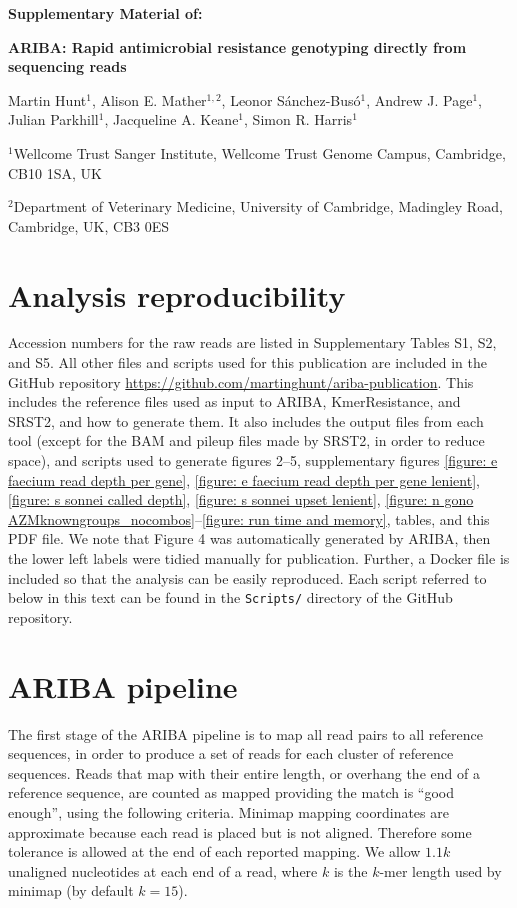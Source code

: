\documentclass[11pt, a4paper]{article}
\begin{document}
\makeatletter
\renewcommand{\thefigure}{S\@arabic\c@figure}
\renewcommand{\thetable}{S\@arabic\c@table}
\makeatother
\thispagestyle{empty}
{\noindent\bf Supplementary Material of: \vspace{2em}}

{\noindent\bf ARIBA: Rapid antimicrobial resistance genotyping directly from sequencing reads\vspace{2em}}


\noindent Martin Hunt$^{1}$,
Alison E. Mather$^{1,2}$,
Leonor S\'{a}nchez-Bus\'{o}$^{1}$,
Andrew J. Page$^{1}$,
Julian Parkhill$^{1}$,
Jacqueline A. Keane$^{1}$,
Simon R. Harris$^{1}$\vspace{2em}

\noindent$^{1}$Wellcome Trust Sanger Institute, Wellcome Trust Genome Campus, Cambridge, CB10 1SA, UK


\noindent$^{2}$Department of Veterinary Medicine, University of Cambridge, Madingley Road, Cambridge, UK, CB3 0ES


\newpage
\setcounter{tocdepth}{1}
\tableofcontents
\newpage


\section{Analysis reproducibility}
Accession numbers for the raw reads are listed in
Supplementary Tables S1, S2, and S5.
All other files and scripts used for this publication
are included in the GitHub repository
\url{https://github.com/martinghunt/ariba-publication}.
This includes the reference files used as input to ARIBA,
KmerResistance, and SRST2, and how to generate them. It also
includes the output files from each tool (except for the BAM
and pileup files made by SRST2, in order to reduce space), and scripts
used to generate figures 2--5, supplementary figures
\ref{figure: e faecium read depth per gene},
\ref{figure: e faecium read depth per gene lenient},
\ref{figure: s sonnei called depth},
\ref{figure: s sonnei upset lenient},
\ref{figure: n gono AZMknowngroups_nocombos}--\ref{figure: run time and memory},
tables, and this
PDF file. We note that Figure 4 was automatically
generated by ARIBA, then the lower left labels
were tidied manually for publication. Further, a Docker
file is included so that the analysis can be easily reproduced.
Each script referred to below in this text can be found
in the \texttt{Scripts/} directory of the GitHub repository.


\section{ARIBA pipeline}
The first stage of the ARIBA pipeline is to map all read pairs to all reference
sequences, in order to produce a set of reads for each cluster of reference
sequences. Reads that map with their entire length, or overhang the end of a
reference sequence, are counted as mapped providing the match is ``good enough'',
using the following criteria. Minimap mapping coordinates are approximate
because each read is placed but is not aligned. Therefore some tolerance is allowed
at the end of each reported mapping. We allow $1.1k$ unaligned nucleotides at each
end of a read, where $k$ is the $k$-mer length used by minimap (by default
$k=15$).
\end{document}
